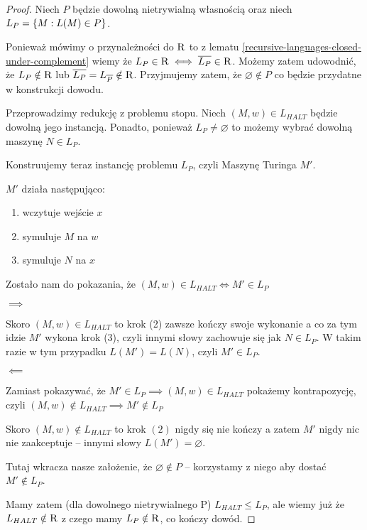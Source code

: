 \begin{proof}
    Niech \( P \) będzie dowolną nietrywialną własnością oraz niech \( L_P = \set{M : L(M) \in P } \).
    
    Ponieważ mówimy o przynależności do \( \textsc{R} \) to z lematu \ref{recursive-languages-closed-under-complement} wiemy że \( L_P \in \textsc{R} \iff \overline{L_P} \in \textsc{R} \). Możemy zatem udowodnić, że \( L_P \notin \textsc{R} \) lub \( \overline{L_P} = L_{\overline{P}} \notin \textsc{R} \). Przyjmujemy zatem, że \( \varnothing \notin P \)  co będzie przydatne w konstrukcji dowodu.
    
    Przeprowadzimy redukcję z problemu stopu.
    Niech \( (M, w) \in L_{HALT} \) będzie dowolną jego instancją. Ponadto, ponieważ \( L_P \neq \varnothing \) to możemy wybrać dowolną maszynę \( N \in L_P \).
    
    Konstruujemy teraz instancję problemu \( L_P \), czyli Maszynę Turinga \( M' \).
    
    \( M' \) działa następująco:
    \begin{enumerate}
        \item wczytuje wejście \( x \)
        \item symuluje \( M \) na \( w \)
        \item symuluje \( N \) na \( x \)
    \end{enumerate}
    
    Zostało nam do pokazania, że \( (M, w) \in L_{HALT} \iff M' \in L_P \)
    \begin{description}
        \item \( \implies \)
        
        Skoro \( (M, w) \in L_{HALT} \) to krok (2) zawsze kończy swoje wykonanie a co za tym idzie \( M' \) wykona krok (3), czyli innymi słowy zachowuje się jak \( N \in L_P \). W takim razie w tym przypadku \( L(M') = L(N) \), czyli \( M' \in L_P \).
        
        \item \( \impliedby \)
        
        Zamiast pokazywać, że \( M' \in L_P \implies (M, w) \in L_{HALT} \) pokażemy kontrapozycję, czyli \( (M, w) \notin L_{HALT} \implies M' \notin L_P \)
        
        Skoro \( (M, w) \notin L_{HALT} \) to krok \( (2) \) nigdy się nie kończy a zatem \( M' \) nigdy nic nie zaakceptuje -- innymi słowy \( L(M') = \varnothing \).
        
        Tutaj wkracza nasze założenie, że \( \varnothing \notin P \) -- korzystamy z niego aby dostać \( M' \notin L_P \).
    \end{description}
    
    Mamy zatem (dla dowolnego nietrywialnego P) \( L_{HALT} \leq L_P \), ale wiemy już że \( L_{HALT} \notin \textsc{R} \) z czego mamy \( L_P \notin \textsc{R} \), co kończy dowód.
    
\end{proof}



